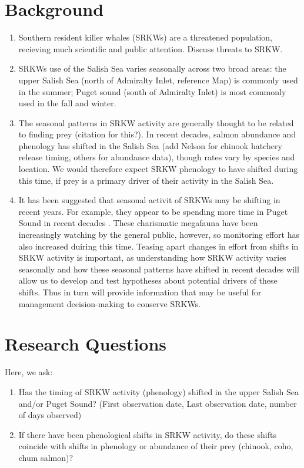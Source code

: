 \documentclass{article}
\begin{document}
\section* {Background}
\begin{enumerate}
\item Southern resident killer whales (SRKWs) are a threatened population, recieving much scientific and public attention. Discuss threats to SRKW.
\item  SRKWs use of the Salish Sea varies seasonally across two broad areas: the upper Salish Sea (north of Admiralty Inlet, reference Map) is commonly used in the summer; Puget sound (south of Admiralty Inlet) is most commonly used in the fall and winter.
\item The seasonal patterns in SRKW activity are generally thought to be related to finding prey (citation for this?). In recent decades, salmon abundance and phenology has shifted in the Salish Sea \citep{weinheimer2017,reed2011,ford2006}(add Nelson for chinook hatchery release timing, others for abundance data), though rates vary by species and location. We would therefore expect SRKW phenology to have shifted during this time, if prey is a primary driver of their activity in the Salish Sea. 
\item It has been suggested that seasonal activit of SRKWs may be shifting in recent years. For example, they appear to be spending more time in Puget Sound in recent decades \citep{olson2018}. These charismatic megafauna have been increasingly watching by the general public, however, so monitoring effort has also increased duiring this time. Teasing apart changes in effort from shifts in SRKW activity is important, as understanding how SRKW activity varies seasonally and how these seasonal patterns have shifted in recent decades will allow us to develop and test hypotheses about potential drivers of these shifts. Thus in turn will provide information that may be useful for management decision-making to conserve SRKWs.



\end{enumerate}
\section* {Research Questions}
Here, we ask:
\begin{enumerate}
\item Has the timing of SRKW activity (phenology) shifted in the upper Salish Sea and/or Puget Sound? (First observation date, Last observation date, number of days observed)
\item If there have been phenological shifts in SRKW activity, do these shifts coincide with shifts in phenology or abundance of their prey (chinook, coho, chum salmon)?
\end{enumerate}
\end{document}
